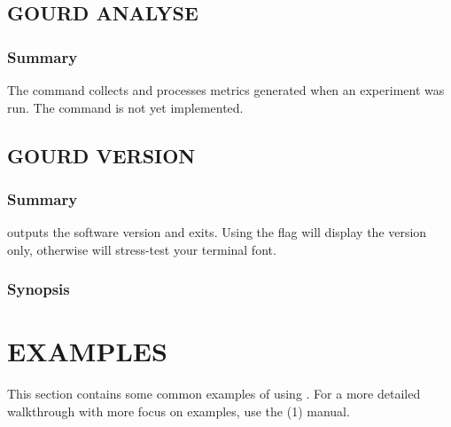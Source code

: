\documentclass[a4paper,english]{article}
\begin{document}
\begin{adjustwidth}{18pt}{0pt}
%


        \subsection{GOURD ANALYSE}

            \subsubsection{Summary}
                The   command collects and processes metrics generated
                when an experiment was run.
                The command is not yet implemented.

        \subsection{GOURD VERSION}

            \subsubsection{Summary}
                  outputs the software version and exits.
                Using the  flag will display the version only, otherwise 
                will stress-test your terminal font.

            \subsubsection{Synopsis}
                  



    \section{EXAMPLES}

        This section contains some common examples of using .
        For a more detailed walkthrough with more focus on examples, use the (1) manual.





\end{adjustwidth}
\end{document}
